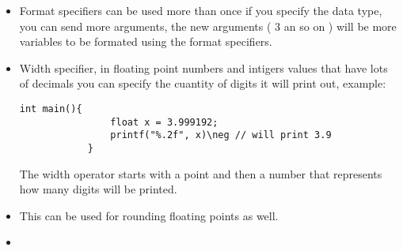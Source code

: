 \begin{itemize}
    \item Format specifiers can be used more than once if you specify the data type, you can send more arguments, the new arguments ( 3 an so on ) will be more variables to be formated using the format specifiers.
    \item Width specifier, in floating point numbers and intigers values that have lots of decimals you can specify the cuantity of digits it will print out, example: 
        \begin{Verbatim}[breaklines=true, breakanywhere=true]
            int main(){
                float x = 3.999192;
                printf("%.2f", x)\neg // will print 3.9
            }
        \end{Verbatim}
    The width operator starts with a point and then a number that represents how many digits will be printed.
    
    \item This can be used for rounding floating points as well.
    \item 
\end{itemize}
